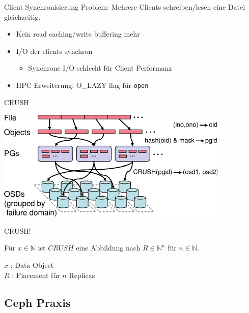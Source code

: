 \documentclass[hyperref={xetex}]{beamer}
\begin{document}
\begin{frame}{Client Synchronisierung}
	Problem: Mehrere Clients schreiben/lesen eine Datei gleichzeitig.

	\begin{itemize}	
		\item Kein read caching/write buffering mehr
		\item I/O der clients synchron %
			\begin{itemize}
				\item Synchrone I/O schlecht f\"ur Client Performanz
			\end{itemize}
		\item HPC Erweiterung: O\_LAZY flag f\"ur \texttt{open}
	\end{itemize}
\end{frame}


\begin{frame}{CRUSH}
	\begin{center}
	\includegraphics{images/crush.pdf}
\end{center}
\end{frame}

\begin{frame}{CRUSH!}

Für $x \in \mathbb{N}$ ist $CRUSH$ eine Abbildung nach $R \in \mathbb{N}^n$ für $n  \in \mathbb{N}$.

$x$ : Data-Object\\
$R$ : Placement für $n$ Replicas
 
\end{frame}

\subsection{Ceph Praxis}
\end{document}
